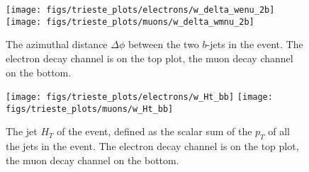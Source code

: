 \begin{figure}[htb]
        \begin{center}
                \leavevmode
                \texttt{[image: figs/trieste\_plots/electrons/w\_delta\_wenu\_2b]}
                \texttt{[image: figs/trieste\_plots/muons/w\_delta\_wmnu\_2b]}
        \end{center}
        \caption{The azimuthal distance $\Delta\phi$ between the two $b$-jets in the event.
          The electron decay channel is on the top plot,
          the muon decay channel on the bottom.}
        \label{fig:bjetDeltaPhi}
\end{figure}

\begin{figure}[htb]
        \begin{center}
                \leavevmode
                \texttt{[image: figs/trieste\_plots/electrons/w\_Ht\_bb]}
                \texttt{[image: figs/trieste\_plots/muons/w\_Ht\_bb]}
        \end{center}
        \caption{The jet $H_{T}$ of the event, defined as the scalar sum of the
          $p_{T}$ of all the jets in the event.
          The electron decay channel is on the top plot,
          the muon decay channel on the bottom.}
        \label{fig:jetHt}
\end{figure}

